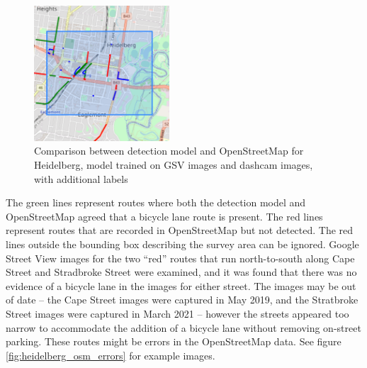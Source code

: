 \documentclass[11pt,twoside]{report}
\begin{document}
\begin{figure}[h]
\centering
\includegraphics[width=0.45\textwidth]{h_model_V2.png}
\caption{Comparison between detection model and OpenStreetMap for Heidelberg, model trained on GSV images and dashcam images, with additional labels}
\label{fig:heidelberg_good}
\end{figure}

The green lines represent routes where both the detection model and OpenStreetMap agreed that a bicycle lane route is present.  The red lines represent routes that are recorded in OpenStreetMap but not detected.  The red lines outside the bounding box describing the survey area can be ignored.  Google Street View images for the two ``red'' routes that run north-to-south along Cape Street and Stradbroke Street were examined, and it was found that there was no evidence of a bicycle lane in the images for either street.  The images may be out of date -- the Cape Street images were captured in May 2019, and the Stratbroke Street images were captured in March 2021 -- however the streets appeared too narrow to accommodate the addition of a bicycle lane without removing on-street parking.  These routes might be errors in the OpenStreetMap data.  See figure \ref{fig:heidelberg_osm_errors} for example images.
\end{document}
